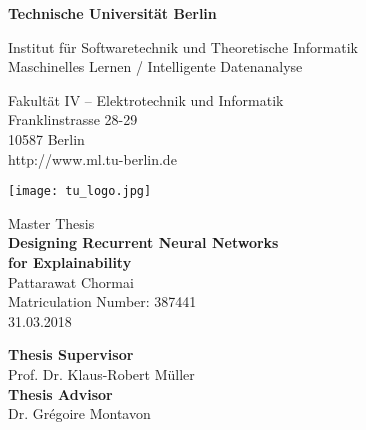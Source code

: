 \thispagestyle{empty}
\begin{center}

\vspace*{1.4cm}
{\LARGE \textbf{Technische Universit\"at Berlin}}

\vspace{0.5cm}

{\large Institut f\"{u}r Softwaretechnik und Theoretische Informatik
\\[1mm]}
{\large Maschinelles Lernen / Intelligente Datenanalyse\\[5mm]}

Fakult\"{a}t IV -- Elektrotechnik und Informatik\\
Franklinstrasse 28-29\\
10587 Berlin\\
http://www.ml.tu-berlin.de\\

\vspace*{1cm}

\texttt{[image: tu\_logo.jpg]}

\vspace*{1.0cm}

{\LARGE Master Thesis}\\

\vspace{1.0cm}
{\LARGE \textbf{Designing Recurrent Neural Networks}}\\
\vspace*{0.3cm}
{\LARGE \textbf{ for Explainability}}\\
\vspace*{1.0cm}
{\LARGE Pattarawat Chormai}
\\
\vspace*{0.5cm}
Matriculation Number: 387441\\
31.03.2018\\ %
\vspace*{1.0cm}

\textbf{Thesis Supervisor}\\
Prof. Dr. Klaus-Robert M\"{u}ller\\
\vspace*{0.5cm}
\textbf{Thesis Advisor}\\
Dr. Gr\'{e}goire Montavon

\vspace{3cm}


\end{center}

